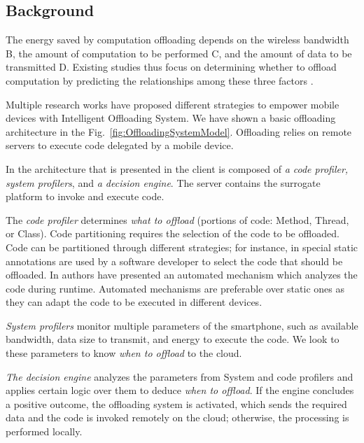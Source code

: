 \documentclass[12pt]{report}
\begin{document}
\subsection{Background}

The energy saved by computation offloading depends on the wireless bandwidth B, the amount of computation to be performed C, and the amount of data to be transmitted D. Existing studies thus focus on determining whether to offload computation by predicting
the relationships among these three factors \cite{kumar2010cloud}.

Multiple research works have proposed different strategies to empower mobile devices with Intelligent Offloading System.
We have shown a basic offloading architecture in the Fig.~\ref{fig:OffloadingSystemModel}. Offloading relies on remote servers to execute code delegated by a mobile device.

In the architecture that is presented in \cite{flores2015mobile} the client is composed of \textit{a code profiler, system profilers}, and \textit{a decision engine}. The server contains the surrogate platform to invoke and execute code.

The \textit{code profiler} determines \textit{what to offload} (portions of code: Method, Thread, or Class). Code partitioning
requires the selection of the code to be offloaded. Code can be partitioned through different strategies; for instance, in \cite{cuervo2010maui} special static annotations are used by a software developer to select the code that should be offloaded. In \cite{chun2011clonecloud} authors have presented an automated mechanism which analyzes the code during runtime. Automated mechanisms are preferable over static ones as they can adapt the code to be executed in different devices.  

\textit{System profilers} monitor multiple parameters of the smartphone, such as available bandwidth, data size to transmit, and
energy to execute the code. We look to these parameters to know \textit{when to offload} to the cloud. 

\textit{The decision engine} analyzes the parameters from System and code profilers and applies certain logic over them to deduce \textit{when to offload}. If the engine concludes a positive outcome, the offloading system is activated, which sends the required data and the code is invoked remotely on the cloud; otherwise, the processing is performed locally.
\end{document}
